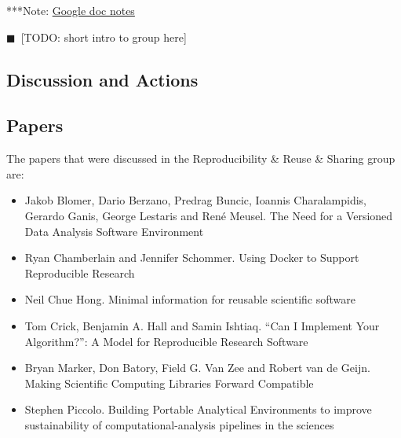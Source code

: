 \documentclass[11pt, oneside]{amsart}
\newcommand{\todo}[1]{{\color{blue}$\blacksquare$~\textsf{[TODO: #1]}}}
\newcommand{\note}[1]{ {\textcolor{blueish}    { ***Note:      #1 }}}
\begin{document}
\note{\href{http://tinyurl.com/kqpe87z}{Google doc notes}}

\todo{short intro to group here}

\subsection{Discussion and Actions}

\subsection{Papers}
The papers that were discussed in the Reproducibility \& Reuse \& Sharing group are:
\begin{itemize}
\item Jakob Blomer, Dario Berzano, Predrag Buncic, Ioannis Charalampidis,
Gerardo Ganis, George Lestaris and Ren\'{e} Meusel. The Need for a Versioned
Data Analysis Software Environment~\cite{wssspe2_blomer}

\item Ryan Chamberlain and Jennifer Schommer. Using {Docker} to Support
Reproducible Research~\cite{wssspe2_chamberlain}

\item Neil Chue Hong. Minimal information for reusable scientific
software~\cite{wssspe2_chue_hong}

\item Tom Crick, Benjamin A. Hall and Samin Ishtiaq. ``Can I Implement Your
Algorithm?'': A Model for Reproducible Research Software~\cite{wssspe2_crick}

\item Bryan Marker, Don Batory, Field G. Van Zee and Robert van de Geijn. Making
Scientific Computing Libraries Forward Compatible~\cite{wssspe2_marker}

\item Stephen Piccolo. Building Portable Analytical Environments to improve
sustainability of computational-analysis pipelines in the
sciences~\cite{wssspe2_piccolo}
\end{itemize}

\end{document}
